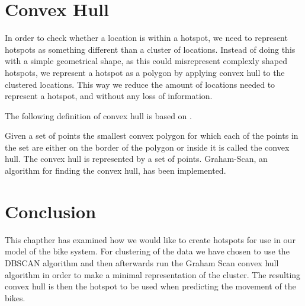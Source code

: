 \section{Convex Hull}\label{convex_hull}
In order to check whether a location is within a hotspot, we need to represent hotspots as something different than a cluster of locations.
Instead of doing this with a simple geometrical shape, as this could misrepresent complexly shaped hotspots, we represent a hotspot as a polygon by applying convex hull to the clustered locations.
This way we reduce the amount of locations needed to represent a hotspot, and without any loss of information.

The following definition of convex hull is based on \citet[section 33.3]{aadbook}.

Given a set of points the smallest convex polygon for which each of the points in the set are either on the border of the polygon or inside it is called the convex hull\cite[33.1-5]{aadbook}.
The convex hull is represented by a set of points.
Graham-Scan\cite[page 1031]{aadbook}, an algorithm for finding the convex hull, has been implemented.


\section{Conclusion}

This chapther has examined how we would like to create hotspots for use in our model of the bike system.
For clustering of the data we have chosen to use the DBSCAN algorithm and then afterwards run the Graham Scan convex hull algorithm in order to make a minimal representation of the cluster.
The resulting convex hull is then the hotspot to be used when predicting the movement of the bikes.